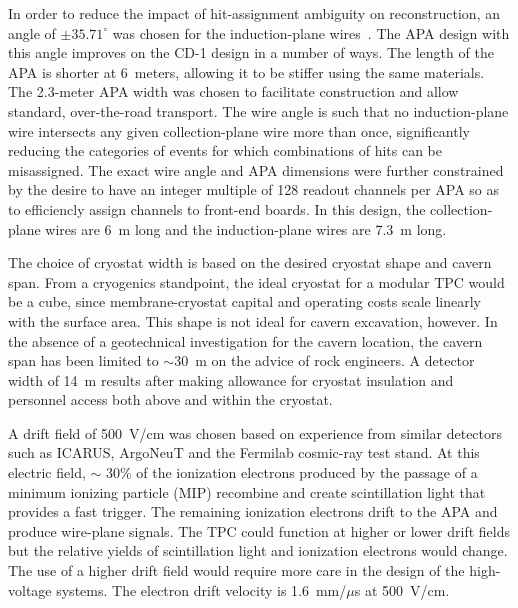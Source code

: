 In order to reduce the impact of hit-assignment ambiguity on
reconstruction, an angle of $\pm35.71^\circ$ was chosen for the
induction-plane wires~\cite{docdb-9374,docdb8981,docdb9886}.  The APA
design with this angle improves on the CD-1  design in a number of
ways.  The length of the APA is shorter at 6~meters, allowing it to be
stiffer using the same materials.  The 2.3-meter APA width was chosen
to facilitate construction and allow standard, over-the-road
transport. The wire angle is such that no induction-plane wire
intersects any given collection-plane wire more than once,
significantly reducing the categories of events for which combinations
of hits can be misassigned.  The exact wire angle and APA dimensions
were further constrained by the desire to have an integer multiple of
128 readout channels per APA so as to efficiencly assign channels to
front-end boards.  In this design, the collection-plane wires are 6~m
long and the induction-plane wires are 7.3~m long.

The choice of cryostat width is based on the desired cryostat shape
and cavern span. From a cryogenics standpoint, the ideal cryostat for
a modular TPC would be a cube, since membrane-cryostat capital and
operating costs scale linearly with the surface area. This shape is
not ideal for cavern excavation, however. In the absence of a
geotechnical investigation for the cavern location, the cavern span
has been limited to $\sim$30~m on the advice of rock engineers.  A
detector width of 14~m results after making allowance for cryostat
insulation and personnel access both above and within the cryostat.

A drift field of 500~V/cm was chosen based on experience from similar
detectors such as ICARUS, ArgoNeuT and the Fermilab cosmic-ray test
stand. At this electric field, $\sim$ 30\% of the ionization electrons
produced by the passage of a minimum ionizing particle (MIP) recombine
and create scintillation light that provides a fast trigger. The
remaining ionization electrons drift to the APA and produce wire-plane
signals. The TPC could function at higher or lower drift fields but
the relative yields of scintillation light and ionization electrons
would change. The use of a higher drift field would require more care
in the design of the high-voltage systems. The electron drift velocity
is 1.6~mm/$\mu$s at 500~V/cm.


